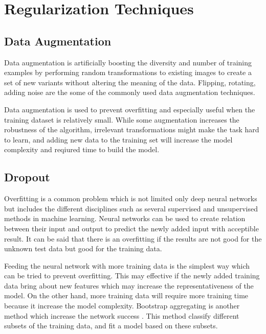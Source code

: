 \section{Regularization Techniques}

    \subsection{Data Augmentation}

        Data augmentation is artificially boosting the diversity and number of training examples by performing random transformations to existing images to create a set of new variants without altering the meaning of the data.
        Flipping, rotating, adding noise are the some of the commonly used data augmentation techniques.

        Data augmentation is used to prevent overfitting and especially useful when the training dataset is relatively small.
        While some augmentation increases the robustness of the algorithm, irrelevant transformations might make the task hard to learn, and adding new data to the training set will increase the model complexity and reqiured time to build the model.

    \subsection{Dropout}

        Overfitting is a common problem which is not limited only deep neural networks but includes the different disciplines such as several supervised and unsupervised methods in machine learning.
        Neural networks can be used to create relation between their input and output to predict the newly added input with acceptible result.
        It can be said that there is an overfitting if the results are not good for the unknown test data but good for the training data.

        Feeding the neural network with more training data is the simplest way which can be tried to prevent overfitting.
        This may effective if the newly added training data bring about new features which may increase the representativeness of the model. On the other hand, more training data will require more training time because it increase the model complexity.
        Bootstrap aggregating is another method which increase the network success \cite{breiman1996bagging}.
        This method classify different subsets of the training data, and fit a model based on these subsets.

